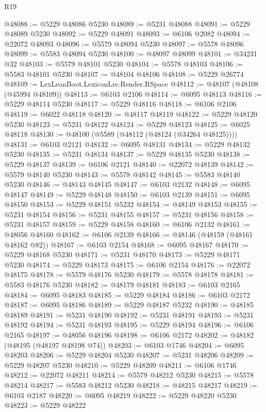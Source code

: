 \begin{lexlean}{R19}
\begin{coremodule}
@48088 := @5229 @48086 @5230
@48089 := @5231 @48088
@48091 := @5229 @48089 @5230
@48092 := @5229 @48091
@48093 := @6106 @2082
@48094 := @22072 @48093
@48096 := @5579 @48094 @5230
@48097 := @5578 @48096
@48099 := @5583 @48094 @5230
@48100 := @48097 @48099
@48101 := @34231 @32
@48103 := @5579 @48101 @5230
@48104 := @5578 @48103
@48106 := @5583 @48101 @5230
@48107 := @48104 @48106
@48108 := @5229 @26774
@48109 := LexLeanBoot.LexiconLre.Render.RSpace
@48112 := @48107 (@48108 (@45994 @48109))
@48113 := @6103 @2106
@48114 := @6095 @48113
@48116 := @5229 @48114 @5230
@48117 := @5229 @48116
@48118 := @6106 @2106
@48119 := @6022 @48118
@48120 := @48117 @48119
@48122 := @5229 @48120 @5230
@48123 := @5231 @48122
@48124 := @5229 @48123
@48125 := @6025 @48118
@48130 := @48100 (@5589 (@48112 (@48124 (@34264 @48125))))
@48131 := @6103 @2121
@48132 := @6095 @48131
@48134 := @5229 @48132 @5230
@48135 := @5231 @48134
@48137 := @5229 @48135 @5230
@48138 := @5229 @48137
@48139 := @6106 @2121
@48140 := @22072 @48139
@48142 := @5579 @48140 @5230
@48143 := @5578 @48142
@48145 := @5583 @48140 @5230
@48146 := @48143 @48145
@48147 := @6103 @2132
@48148 := @6095 @48147
@48149 := @5229 @48148
@48150 := @6103 @2139
@48151 := @6095 @48150
@48153 := @5229 @48151 @5232
@48154 := @48149 @48153
@48155 := @5231 @48154
@48156 := @5231 @48155
@48157 := @5231 @48156
@48158 := @5231 @48157
@48159 := @5229 @48158
@48160 := @6106 @2132
@48161 := @48056 @48160
@48162 := @6106 @2139
@48166 := @48146 (@48159 (@48161 @48162 @82))
@48167 := @6103 @2154
@48168 := @6095 @48167
@48170 := @5229 @48168 @5230
@48171 := @5231 @48170
@48173 := @5229 @48171 @5230
@48174 := @5229 @48173
@48175 := @6106 @2154
@48176 := @22072 @48175
@48178 := @5579 @48176 @5230
@48179 := @5578 @48178
@48181 := @5583 @48176 @5230
@48182 := @48179 @48181
@48183 := @6103 @2165
@48184 := @6095 @48183
@48185 := @5229 @48184
@48186 := @6103 @2172
@48187 := @6095 @48186
@48189 := @5229 @48187 @5232
@48190 := @48185 @48189
@48191 := @5231 @48190
@48192 := @5231 @48191
@48193 := @5231 @48192
@48194 := @5231 @48193
@48195 := @5229 @48194
@48196 := @6106 @2165
@48197 := @48056 @48196
@48198 := @6106 @2172
@48202 := @48182 (@48195 (@48197 @48198 @74))
@48203 := @6103 @1746
@48204 := @6095 @48203
@48206 := @5229 @48204 @5230
@48207 := @5231 @48206
@48209 := @5229 @48207 @5230
@48210 := @5229 @48209
@48211 := @6106 @1746
@48212 := @22072 @48211
@48214 := @5579 @48212 @5230
@48215 := @5578 @48214
@48217 := @5583 @48212 @5230
@48218 := @48215 @48217
@48219 := @6103 @2187
@48220 := @6095 @48219
@48222 := @5229 @48220 @5230
@48223 := @5229 @48222

\end{coremodule}
\end{lexlean}
